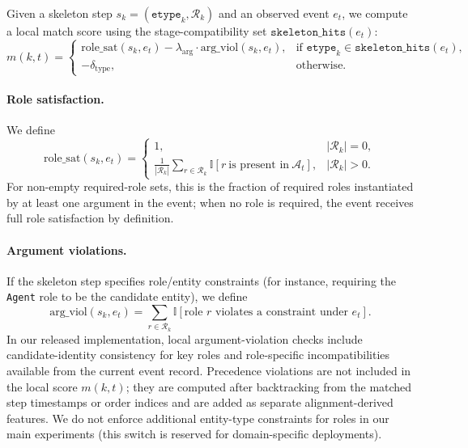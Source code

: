 \documentclass{article}
\begin{document}
Given a skeleton step
$s_k=(\texttt{etype}_k,\mathcal{R}_k)$
and an observed event $e_t$, we compute a local match score using the stage-compatibility set
$\texttt{skeleton\_hits}(e_t)$:
\begin{equation}
m(k,t)=
\begin{cases}
\mathrm{role\_sat}(s_k,e_t)
-\lambda_{\mathrm{arg}}\cdot \mathrm{arg\_viol}(s_k,e_t),
& \text{if } \texttt{etype}_k\in\texttt{skeleton\_hits}(e_t),\\[2pt]
-\delta_{\mathrm{type}},
& \text{otherwise.}
\end{cases}
\end{equation}

\paragraph{Role satisfaction.}
We define
\begin{equation}
\mathrm{role\_sat}(s_k,e_t)=
\begin{cases}
1, & |\mathcal{R}_k|=0,\\[2pt]
\frac{1}{|\mathcal{R}_k|}
\sum_{r\in\mathcal{R}_k}
\mathbb{I}[r\ \text{is present in}\ \mathcal{A}_t],
& |\mathcal{R}_k|>0.
\end{cases}
\end{equation}
For non-empty required-role sets, this is the fraction of required roles instantiated by at least one argument in the event; when no role is required, the event receives full role satisfaction by definition.

\paragraph{Argument violations.}
If the skeleton step specifies role/entity constraints (for instance, requiring the \texttt{Agent} role to be the candidate entity), we define
\begin{equation}
\mathrm{arg\_viol}(s_k,e_t)=\sum_{r\in\mathcal{R}_k}\mathbb{I}[\text{role }r\text{ violates a constraint under }e_t].
\end{equation}
In our released implementation, local argument-violation checks include candidate-identity consistency for key roles and role-specific incompatibilities available from the current event record.
Precedence violations are not included in the local score $m(k,t)$; they are computed after backtracking from the matched step timestamps or order indices and are added as separate alignment-derived features.
We do not enforce additional entity-type constraints for roles in our main experiments (this switch is reserved for domain-specific deployments).
\end{document}

